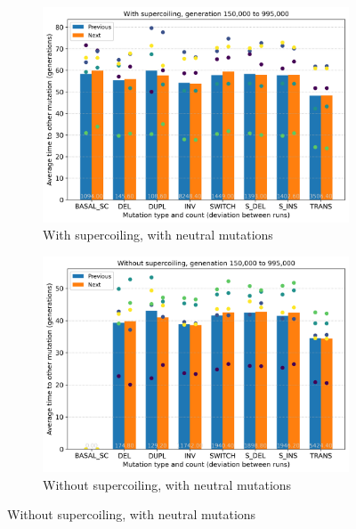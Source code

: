 \begin{figure}[h]
  \begin{subfigure}[t]{0.49\textwidth}
    \includegraphics[width=\textwidth]{aevol/images/with_sc_mut_time_150k_995k.png}
    \caption{With supercoiling, with neutral mutations}
    \label{subfig:sc_neut}
  \end{subfigure}
  \begin{subfigure}[t]{0.5\textwidth}
    \includegraphics[width=\textwidth]{aevol/images/without_sc_mut_time_150k_995k.png}
    \caption{Without supercoiling, with neutral mutations}
    \label{subfig:no_sc_neut}
  \end{subfigure}


\end{figure}
